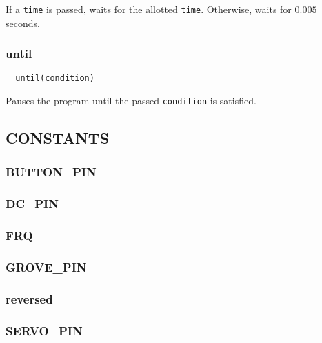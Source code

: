 \documentclass[12pt]{scrartcl} %
\begin{document}
If a \texttt{time} is passed, waits for the allotted
\texttt{time}. Otherwise, waits for $0.005$ seconds.

\subsubsection{until}

\begin{verbatim}
  until(condition)
\end{verbatim}

Pauses the program until the passed \texttt{condition} is
satisfied.

\subsection{CONSTANTS}

\subsubsection{BUTTON\_PIN}

\subsubsection{DC\_PIN}

\subsubsection{FRQ}

\subsubsection{GROVE\_PIN}

\subsubsection{reversed}

\subsubsection{SERVO\_PIN}

\end{document}
